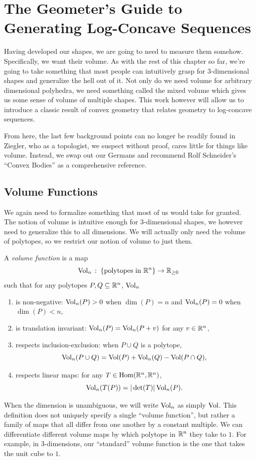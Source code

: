 \documentclass[12pt,oneside]{../../sfsuthesis}
\begin{document}
\section{The Geometer's Guide to Generating Log-Concave Sequences}
Having developed our shapes, we are going to need to measure them somehow.
Specifically, we want their volume.
As with the rest of this chapter so far, we're going to take something that most people can intuitively grasp for 3-dimensional shapes and generalize the hell out of it.
Not only do we need volume for arbitrary dimensional polyhedra, we need something called the mixed volume which gives us some sense of volume of multiple shapes.
This work however will allow us to introduce a classic result of convex geometry that relates geometry to log-concave sequences.

From here, the last few background points can no longer be readily found in Ziegler, who as a topologist, we suspect without proof, cares little for things like volume.
Instead, we swap out our Germans and recommend Rolf Schneider's ``Convex Bodies'' \cite{schneiderConvexBodiesBrunn2013} as a comprehensive reference.

\subsection{Volume Functions}
We again need to formalize something that most of us would take for granted.
The notion of volume is intuitive enough for 3-dimensional shapes, we however need to generalize this to all dimensions.
We will actually only need the volume of polytopes, so we restrict our notion of volume to just them.
\begin{definition}
    A \emph{volume function} is a map
    \[
        \operatorname{Vol}_n\,:\; \{\text{polytopes in \( \mathbb{R}^n \)}\} \to \mathbb{R}_{\geq 0}
    \]
    such that for any polytopes \( P,Q \subseteq \mathbb{R}^n \), \( \operatorname{Vol}_n \)
    \begin{enumerate}
        \item{is non-negative:} \( \operatorname{Vol}_n(P) > 0 \) when \( \dim(P) = n \) and \( \operatorname{Vol}_n(P) = 0 \) when \( \dim(P) < n \),
        \item{is translation invariant:} \( \operatorname{Vol}_n(P) =  \operatorname{Vol}_n(P+v) \) for any \( v \in \mathbb{R}^n \),
        \item{respects inclusion-exclusion:} when \( P \cup Q \) is a polytope,
        \[
            \operatorname{Vol}_n(P \cup Q) = \operatorname{Vol}(P) + \operatorname{Vol}_n(Q) - \operatorname{Vol}(P \cap Q),
        \]
        \item{respects linear maps:} for any \( T \in \operatorname{Hom}(\mathbb{R}^n, \mathbb{R}^n) \),
        \[
            \operatorname{Vol}_n(T(P)) = |\det(T)|\operatorname{Vol}_n(P).
        \]
    \end{enumerate}
\end{definition}
When the dimension is unambiguous, we will write \( \operatorname{Vol}_n \) as simply \( \operatorname{Vol} \).
This definition does not uniquely specify a single ``volume function'', but rather a family of maps that all differ from one another by a constant multiple.
We can differentiate different volume maps by which polytope in \( \mathbb{R}^n \) they take to \( 1 \).
For example, in \( 3 \)-dimensions, our ``standard'' volume function is the one that takes the unit cube to \( 1 \).
\end{document}
